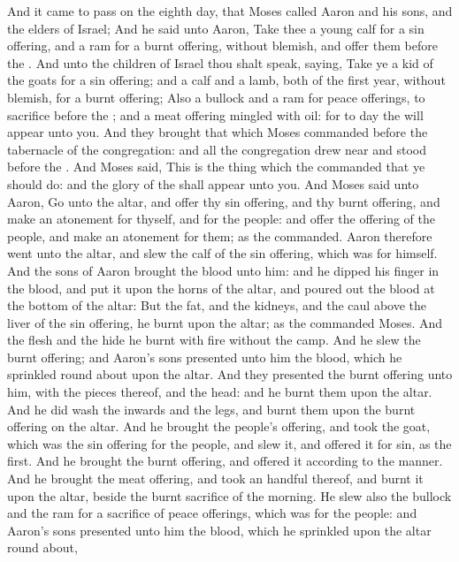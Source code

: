 \begin{biblechapter} %
 And it came to pass on the eighth day, that Moses called Aaron and his sons, and the elders of Israel;
\verse And he said unto Aaron, Take thee a young calf for a sin offering, and a ram for a burnt offering, without blemish, and offer them before the \LORD.
\verse And unto the children of Israel thou shalt speak, saying, Take ye a kid of the goats for a sin offering; and a calf and a lamb, both of the first year, without blemish, for a burnt offering;
\verse Also a bullock and a ram for peace offerings, to sacrifice before the \LORD; and a meat offering mingled with oil: for to day the \LORD will appear unto you.
\verse And they brought that which Moses commanded before the tabernacle of the congregation: and all the congregation drew near and stood before the \LORD.
\verse And Moses said, This is the thing which the \LORD commanded that ye should do: and the glory of the \LORD shall appear unto you.
\verse And Moses said unto Aaron, Go unto the altar, and offer thy sin offering, and thy burnt offering, and make an atonement for thyself, and for the people: and offer the offering of the people, and make an atonement for them; as the \LORD commanded.
\verse Aaron therefore went unto the altar, and slew the calf of the sin offering, which was for himself.
\verse And the sons of Aaron brought the blood unto him: and he dipped his finger in the blood, and put it upon the horns of the altar, and poured out the blood at the bottom of the altar:
\verse But the fat, and the kidneys, and the caul above the liver of the sin offering, he burnt upon the altar; as the \LORD commanded Moses.
\verse And the flesh and the hide he burnt with fire without the camp.
\verse And he slew the burnt offering; and Aaron's sons presented unto him the blood, which he sprinkled round about upon the altar.
\verse And they presented the burnt offering unto him, with the pieces thereof, and the head: and he burnt them upon the altar.
\verse And he did wash the inwards and the legs, and burnt them upon the burnt offering on the altar.
\verse And he brought the people's offering, and took the goat, which was the sin offering for the people, and slew it, and offered it for sin, as the first.
\verse And he brought the burnt offering, and offered it according to the manner.
\verse And he brought the meat offering, and took an handful thereof, and burnt it upon the altar, beside the burnt sacrifice of the morning.
\verse He slew also the bullock and the ram for a sacrifice of peace offerings, which was for the people: and Aaron's sons presented unto him the blood, which he sprinkled upon the altar round about,

\end{biblechapter}
